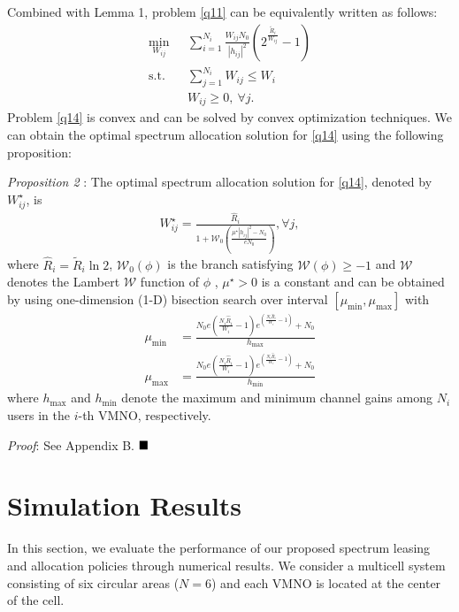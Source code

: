\documentclass[journal]{IEEEtran}
\begin{document}
Combined with Lemma 1, problem \eqref{q11} can be equivalently written as follows:
\begin{subequations}\label{q14}
	\begin{align}
	\min_{W_{ij}}\ & \sum\limits_{i = 1}^{N_i} \frac{W_{ij}N_0}{\left|h_{ij}\right|^2}\left(2^{\frac{\tilde{R}_i}{W_{ij}}} - 1\right) \label{q14a} \\ \mbox{s.t.} \quad &  \sum\limits_{j = 1}^{N_i} W_{ij} \leq W_i \label{q14b} \\
	& W_{ij} \geq 0, \ \forall j. \label{q14c}
	\end{align}
\end{subequations}
Problem \eqref{q14} is convex and can be solved by convex optimization techniques. We can obtain the optimal spectrum allocation solution for \eqref{q14} using the following proposition:

\textit{Proposition 2} : The optimal spectrum allocation solution for \eqref{q14}, denoted by $W_{ij}^\star$, is
\begin{align}
W_{ij}^\star = \frac{\hat{R}_i}{1 + \mathcal{W}_0\left(\frac{\mu^{\star}\left|h_{ij}\right|^2 - N_0}{eN_0}\right)}, \forall j,
\end{align}
where $\hat{R}_i = \tilde{R}_i\ln2$, $\mathcal{W}_0\left(\phi\right)$ is the branch satisfying $\mathcal{W}\left(\phi\right) \geq -1$ and $\mathcal{W}$ denotes the Lambert $\mathcal{W}$ function of $\phi$ \cite{RMCorless}, $\mu^{\star} > 0$ is a constant and can be obtained by using one-dimension (1-D) bisection search over interval $\left[\mu_{\mbox{min}}, \mu_{\mbox{max}}\right]$ with
\begin{align}
\mu_{\mbox{min}} &= \frac{N_0e\left(\frac{N_i\hat{R}_i}{W_i} - 1\right)e^{\left(\frac{N_i\hat{R}_i}{W_i} - 1\right)} + N_0}{h_{\mbox{max}}}  \\
\mu_{\mbox{max}} & = \frac{N_0e\left(\frac{N_i\hat{R}_i}{W_i} - 1\right)e^{\left(\frac{N_i\hat{R}_i}{W_i} - 1\right)} + N_0}{h_{\mbox{min}}}
\end{align}
where $h_{\mbox{max}}$ and $h_{\mbox{min}}$ denote the maximum and minimum channel gains among $N_i$ users in the $i$-th VMNO, respectively.

\textit{Proof}: See Appendix B.  $\hfill\blacksquare$
\section{Simulation Results}
In this section, we evaluate the performance of our proposed spectrum leasing and allocation policies through numerical results. We consider a multicell system consisting of six circular areas ($N = 6$) and each VMNO is located at the center of the cell. 
\end{document}
